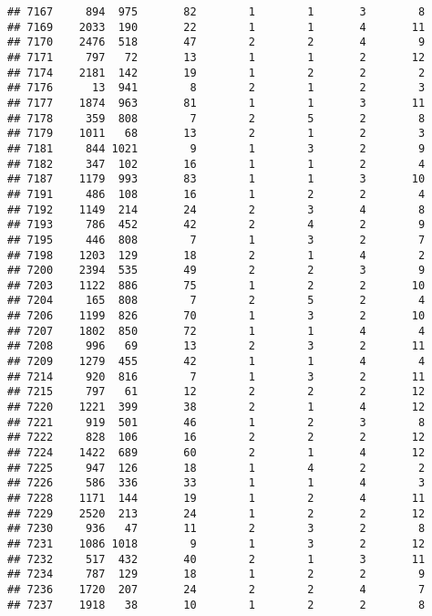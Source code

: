\documentclass[]{article}
\begin{document}
\begin{verbatim}
## 7167     894  975       82        1        1       3        8
## 7169    2033  190       22        1        1       4       11
## 7170    2476  518       47        2        2       4        9
## 7171     797   72       13        1        1       2       12
## 7174    2181  142       19        1        2       2        2
## 7176      13  941        8        2        1       2        3
## 7177    1874  963       81        1        1       3       11
## 7178     359  808        7        2        5       2        8
## 7179    1011   68       13        2        1       2        3
## 7181     844 1021        9        1        3       2        9
## 7182     347  102       16        1        1       2        4
## 7187    1179  993       83        1        1       3       10
## 7191     486  108       16        1        2       2        4
## 7192    1149  214       24        2        3       4        8
## 7193     786  452       42        2        4       2        9
## 7195     446  808        7        1        3       2        7
## 7198    1203  129       18        2        1       4        2
## 7200    2394  535       49        2        2       3        9
## 7203    1122  886       75        1        2       2       10
## 7204     165  808        7        2        5       2        4
## 7206    1199  826       70        1        3       2       10
## 7207    1802  850       72        1        1       4        4
## 7208     996   69       13        2        3       2       11
## 7209    1279  455       42        1        1       4        4
## 7214     920  816        7        1        3       2       11
## 7215     797   61       12        2        2       2       12
## 7220    1221  399       38        2        1       4       12
## 7221     919  501       46        1        2       3        8
## 7222     828  106       16        2        2       2       12
## 7224    1422  689       60        2        1       4       12
## 7225     947  126       18        1        4       2        2
## 7226     586  336       33        1        1       4        3
## 7228    1171  144       19        1        2       4       11
## 7229    2520  213       24        1        2       2       12
## 7230     936   47       11        2        3       2        8
## 7231    1086 1018        9        1        3       2       12
## 7232     517  432       40        2        1       3       11
## 7234     787  129       18        1        2       2        9
## 7236    1720  207       24        2        2       4        7
## 7237    1918   38       10        1        2       2        8

\end{verbatim}
\end{document}
